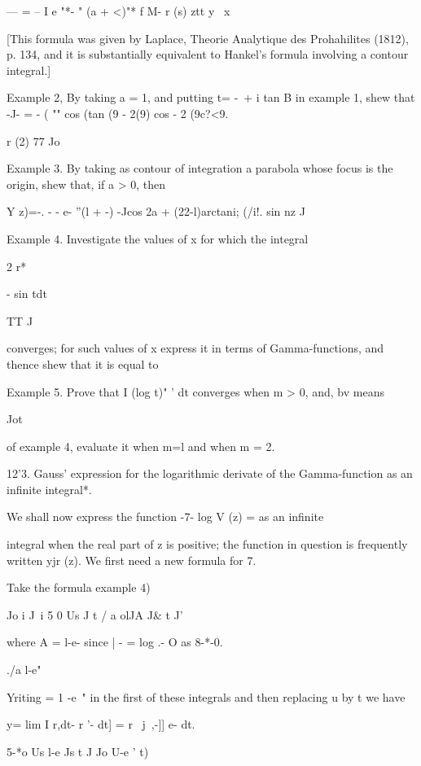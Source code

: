 --- = -- I e "*- " (a + <)"* f M- r (s) ztt y \ x

[This formula was given by Laplace, Theorie Analytique des
Prohahilites (1812), p. 134, and it is substantially equivalent to
Hankel's formula involving a contour integral.]

Example 2, By taking a = 1, and putting t= -\ + i tan B in example 1,
shew that -J- = - ( "" cos (tan (9 - 2(9) cos - 2 (9c?<9.

r (2) 77 Jo

Example 3. By taking as contour of integration a parabola whose focus
is the origin, shew that, if a > 0, then

Y z)=-. - - e- ''(l + -) -Jcos 2a + (22-l)arctani; (/i!. sin nz J


Example 4. Investigate the values of x for which the integral

2 r*

 - sin tdt

TT J

converges; for such values of x express it in terms of
Gamma-functions, and thence shew that it is equal to


Example 5. Prove that I (log t)" ' dt converges when m > 0, and, bv
means

Jot

of example 4, evaluate it when m=l and when m = 2.

12'3. Gauss' expression for the logarithmic derivate of the
Gamma-function as an infinite integral*.

We shall now express the function -7- log V (z) = as an infinite

integral when the real part of z is positive; the function in
question is frequently written yjr (z). We first need a new formula
for 7.

Take the formula  example 4)

  Jo i J\ i 5 0 Us J t / a olJA J\& t J'

where A = l-e- since | - = log .- O as 8-*-0.

./a l-e"

 Yriting = 1 -e~" in the first of these integrals and then replacing u
by t we have

y= lim I r,dt- r '- dt] = r \ j~,-]] e- dt.

5-*o Us l-e Js t J Jo U-e ' t)

